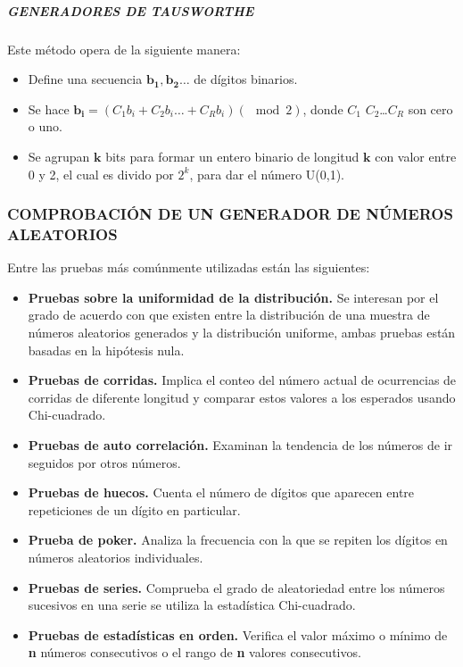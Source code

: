  	\subparagraph*{GENERADORES DE TAUSWORTHE}
 	\noindent Este método opera de la siguiente manera: 
 	\begin{itemize}
 		\item Define una secuencia $\mathbf{b_1,b_2\dots}$ de dígitos binarios.
 		\item Se hace $\mathbf{b_i}=(C_1b_i+C_2b_i\dots+C_Rb_i)(\mod2)$, donde $C_1$ $C_2$\dots$C_R$ son cero o uno.
 		\item  Se agrupan $\mathbf{k}$ bits para formar un entero binario de longitud $\mathbf{k}$ con valor entre 0 y 2, el cual es divido por $2^k$, para dar el número U(0,1).
 	\end{itemize}
 
	\subsubsection*{COMPROBACIÓN DE UN GENERADOR DE NÚMEROS ALEATORIOS}
	\noindent Entre las pruebas más comúnmente utilizadas están las siguientes:
	
	\begin{itemize}
		\item \textbf{Pruebas sobre la uniformidad de la distribución.} Se interesan por el grado de acuerdo con que existen entre la distribución de una muestra de números aleatorios generados y la distribución uniforme, ambas pruebas están basadas en la hipótesis nula. 
		\item \textbf{Pruebas de corridas.} Implica el conteo del número actual de ocurrencias de corridas de diferente longitud y comparar estos valores a los esperados usando Chi-cuadrado.
		\item \textbf{Pruebas de auto correlación.} Examinan la tendencia de los números de ir seguidos por otros números.
		\item \textbf{Pruebas de huecos.} Cuenta el número de dígitos que aparecen entre repeticiones de un dígito en particular.
		\item \textbf{Prueba de poker.} Analiza la frecuencia con la que se repiten los dígitos en números aleatorios individuales.
		\item \textbf{Pruebas de series.} Comprueba el grado de aleatoriedad entre los números sucesivos en una serie se utiliza la estadística Chi-cuadrado.
		\item \textbf{Pruebas de estadísticas en orden.} Verifica el valor máximo o mínimo de \textbf{n} números consecutivos o el rango de \textbf{n} valores consecutivos.
	\end{itemize}
	
